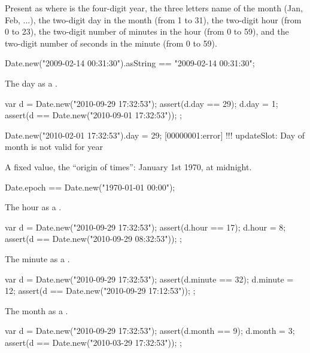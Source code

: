 \begin{urbiscriptapi}
\item[asString] Present as  where  is the four-digit
  year,  the three letters name of the month (Jan, Feb, ...),
   the two-digit day in the month (from 1 to 31),  the
  two-digit hour (from 0 to 23),  the two-digit number of minutes in
  the hour (from 0 to 59), and  the two-digit number of seconds in
  the minute (from 0 to 59).
\begin{urbiassert}
Date.new("2009-02-14 00:31:30").asString == "2009-02-14 00:31:30";
\end{urbiassert}

\item[day]
  The day as a .
\begin{urbiscript}
{
  var d = Date.new("2010-09-29 17:32:53");
  assert(d.day == 29);
  d.day = 1;
  assert(d == Date.new("2010-09-01 17:32:53"));
};
\end{urbiscript}
\begin{urbiscript}
Date.new("2010-02-01 17:32:53").day = 29;
[00000001:error] !!! updateSlot: Day of month is not valid for year
\end{urbiscript}

\item[epoch]
  A fixed value, the ``origin of times'': January 1st 1970, at
  midnight.
\begin{urbiunchecked}
Date.epoch == Date.new("1970-01-01 00:00");
\end{urbiunchecked}

\item[hour]
  The hour as a .
\begin{urbiscript}
{
  var d = Date.new("2010-09-29 17:32:53");
  assert(d.hour == 17);
  d.hour = 8;
  assert(d == Date.new("2010-09-29 08:32:53"));
};
\end{urbiscript}

\item[minute]
  The minute as a .
\begin{urbiscript}
{
  var d = Date.new("2010-09-29 17:32:53");
  assert(d.minute == 32);
  d.minute = 12;
  assert(d == Date.new("2010-09-29 17:12:53"));
};
\end{urbiscript}

\item[month]
  The month as a .
\begin{urbiscript}
{
  var d = Date.new("2010-09-29 17:32:53");
  assert(d.month == 9);
  d.month = 3;
  assert(d == Date.new("2010-03-29 17:32:53"));
};
\end{urbiscript}


\end{urbiscriptapi}
